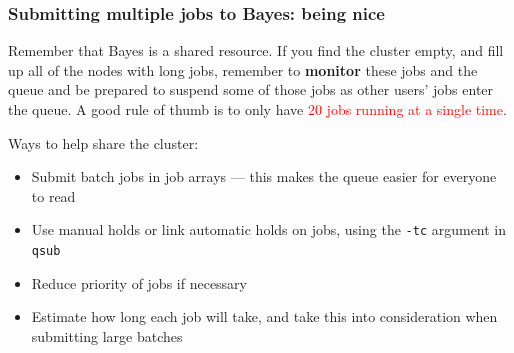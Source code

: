 \documentclass[12pt, 
hyperref={colorlinks=true, linkcolor=blue, urlcolor=cyan}]{beamer}
\newcommand{\myframe}[1]{\begin{frame} \frametitle{#1}}
\begin{document}
\myframe{Submitting multiple jobs to Bayes: being nice}
Remember that Bayes is a shared resource. If you find the cluster empty, and fill up all of the nodes with long jobs, remember to \textbf{monitor} these jobs and the queue and be prepared to suspend some of those jobs as other users' jobs enter the queue. A good rule of thumb is to only have \textcolor{red}{20 jobs running at a single time}.

Ways to help share the cluster:
\begin{itemize}
\item Submit batch jobs in job arrays --- this makes the queue easier for everyone to read
\item Use manual holds or link automatic holds on jobs, using the \texttt{-tc} argument in \texttt{qsub}
\item Reduce priority of jobs if necessary
\item Estimate how long each job will take, and take this into consideration when submitting large batches
\end{itemize}
\end{frame}
\end{document}
